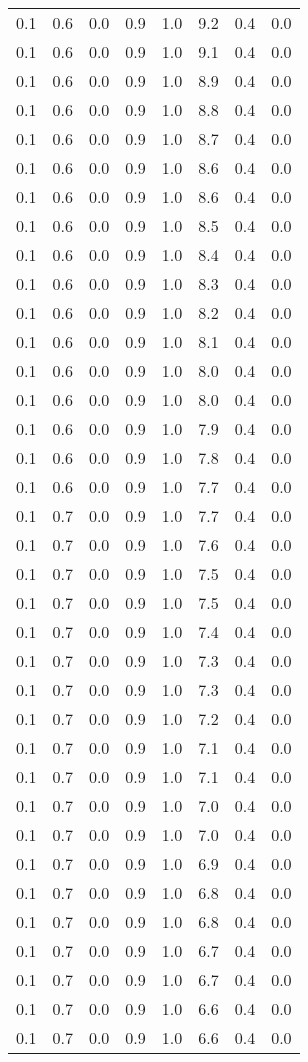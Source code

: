 \begin{tabular}{L{1in}|L{1in}|L{1in}|L{1in}|L{1in}|L{1in}|L{1in}|L{1in}}
0.1&0.6&0.0&0.9&1.0&9.2&0.4&0.0\\
0.1&0.6&0.0&0.9&1.0&9.1&0.4&0.0\\
0.1&0.6&0.0&0.9&1.0&8.9&0.4&0.0\\
0.1&0.6&0.0&0.9&1.0&8.8&0.4&0.0\\
0.1&0.6&0.0&0.9&1.0&8.7&0.4&0.0\\
0.1&0.6&0.0&0.9&1.0&8.6&0.4&0.0\\
0.1&0.6&0.0&0.9&1.0&8.6&0.4&0.0\\
0.1&0.6&0.0&0.9&1.0&8.5&0.4&0.0\\
0.1&0.6&0.0&0.9&1.0&8.4&0.4&0.0\\
0.1&0.6&0.0&0.9&1.0&8.3&0.4&0.0\\
0.1&0.6&0.0&0.9&1.0&8.2&0.4&0.0\\
0.1&0.6&0.0&0.9&1.0&8.1&0.4&0.0\\
0.1&0.6&0.0&0.9&1.0&8.0&0.4&0.0\\
0.1&0.6&0.0&0.9&1.0&8.0&0.4&0.0\\
0.1&0.6&0.0&0.9&1.0&7.9&0.4&0.0\\
0.1&0.6&0.0&0.9&1.0&7.8&0.4&0.0\\
0.1&0.6&0.0&0.9&1.0&7.7&0.4&0.0\\
0.1&0.7&0.0&0.9&1.0&7.7&0.4&0.0\\
0.1&0.7&0.0&0.9&1.0&7.6&0.4&0.0\\
0.1&0.7&0.0&0.9&1.0&7.5&0.4&0.0\\
0.1&0.7&0.0&0.9&1.0&7.5&0.4&0.0\\
0.1&0.7&0.0&0.9&1.0&7.4&0.4&0.0\\
0.1&0.7&0.0&0.9&1.0&7.3&0.4&0.0\\
0.1&0.7&0.0&0.9&1.0&7.3&0.4&0.0\\
0.1&0.7&0.0&0.9&1.0&7.2&0.4&0.0\\
0.1&0.7&0.0&0.9&1.0&7.1&0.4&0.0\\
0.1&0.7&0.0&0.9&1.0&7.1&0.4&0.0\\
0.1&0.7&0.0&0.9&1.0&7.0&0.4&0.0\\
0.1&0.7&0.0&0.9&1.0&7.0&0.4&0.0\\
0.1&0.7&0.0&0.9&1.0&6.9&0.4&0.0\\
0.1&0.7&0.0&0.9&1.0&6.8&0.4&0.0\\
0.1&0.7&0.0&0.9&1.0&6.8&0.4&0.0\\
0.1&0.7&0.0&0.9&1.0&6.7&0.4&0.0\\
0.1&0.7&0.0&0.9&1.0&6.7&0.4&0.0\\
0.1&0.7&0.0&0.9&1.0&6.6&0.4&0.0\\
0.1&0.7&0.0&0.9&1.0&6.6&0.4&0.0\\

\end{tabular}
